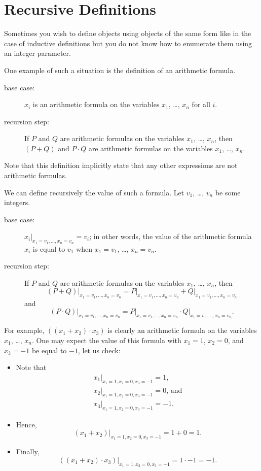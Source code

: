 \section{Recursive Definitions}
Sometimes you wish to define objects using objects of the same form like in the
case of inductive definitions but you do not know how to enumerate them using
an integer parameter.

One example of such a situation is the definition of an arithmetic formula.
\begin{description}
  \item[base case:] $x_i$ is an arithmetic formula on the variables $x_1$,
    \dots, $x_n$ for all $i$.
  \item[recursion step:] If $P$ and $Q$ are arithmetic formulas on the variables
    $x_1$, \dots, $x_n$, then $(P + Q)$ and $P \cdot Q$ are arithmetic formulas
    on the variables $x_1$, \dots, $x_n$.
\end{description}
Note that this definition implicitly state that any other expressions are not
arithmetic formulas.

We can define recursively the value of such a formula. Let $v_1$, \dots, $v_n$
be some integers.
\begin{description}
  \item[base case:] $x_i\big\rvert_{x_1 = v_1, \dots, x_n = v_n} = v_i$; in
    other words, the value of the arithmetic formula $x_i$ is equal to $v_1$
    when $x_1 = v_1$, \dots, $x_n = v_n$.
  \item[recursion step:] If $P$ and $Q$ are arithmetic formulas on the
    variables $x_1$, \dots, $x_n$, then
    \[
      (P + Q)\big\rvert_{x_1 = v_1, \dots, x_n = v_n} =
      P\big\rvert_{x_1 = v_1, \dots, x_n = v_n} +
      Q\big\rvert_{x_1 = v_1, \dots, x_n = v_n}
    \]
    and
    \[
      (P \cdot Q)\big\rvert_{x_1 = v_1, \dots, x_n = v_n} =
      P\big\rvert_{x_1 = v_1, \dots, x_n = v_n} \cdot
      Q\big\rvert_{x_1 = v_1, \dots, x_n = v_n}.
    \]
\end{description}

For example, $((x_1 + x_2) \cdot x_3)$ is clearly an arithmetic formula on the
variables $x_1$, \dots, $x_n$. One may expect the value of this formula with
$x_1 = 1$, $x_2 = 0$, and $x_3 = -1$ be equal to $-1$, let us check:
\begin{itemize}
  \item Note that
    \[
      \begin{array}{l}
        x_1\big\rvert_{x_1 = 1, x_2 = 0, x_3 = -1} = 1, \\
        x_2\big\rvert_{x_1 = 1, x_2 = 0, x_3 = -1} = 0\text{, and} \\
        x_3\big\rvert_{x_1 = 1, x_2 = 0, x_3 = -1} = -1.
      \end{array}
    \]
  \item Hence,
    \[
      (x_1 + x_2)\big\rvert_{x_1 = 1, x_2 = 0, x_3 = -1} = 1 + 0 = 1.
    \]
  \item Finally,
    \[
      ((x_1 + x_2) \cdot x_3)\big\rvert_{x_1 = 1, x_2 = 0, x_3 = -1} = 1 \cdot -
      1 = -1.
    \]
\end{itemize}

